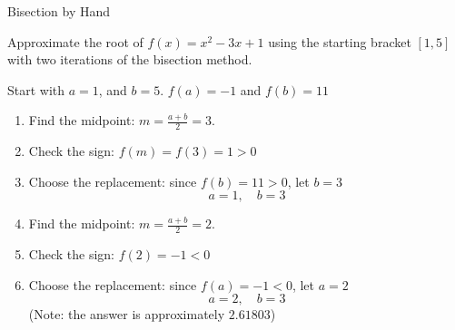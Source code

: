 \documentclass[10pt]{beamer}
\begin{document}
\begin{frame}{Bisection by Hand}

\begin{example}
    Approximate the root of $f(x)=x^2-3x+1$ using the starting bracket $[1,5]$ with two iterations of the bisection method.
\end{example}

Start with $a=1$, and $b=5$. $f(a)= -1$ and $f(b)=11$
\begin{enumerate}
    \item Find the midpoint: $m = \frac{a+b}{2}=3$.
    \item Check the sign: $f(m)=f(3)=1>0$
    \item Choose the replacement: since $f(b)=11>0$, let $b=3$
                $$ a = 1, \quad b=3$$
    \item Find the midpoint: $m=\frac{a+b}{2}=2$.
    \item Check the sign: $f(2)=-1<0$
    \item Choose the replacement: since $f(a)=-1<0$, let $a=2$
                $$ a = 2, \quad b=3$$
    (Note: the answer is approximately $2.61803$)
\end{enumerate}
    
\end{frame}


    

    


\end{document}
